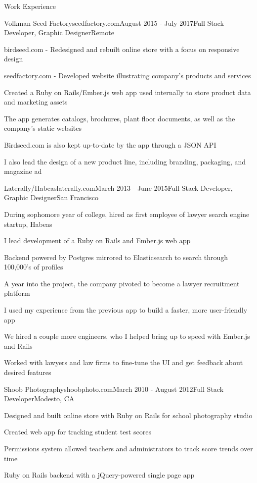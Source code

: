 \documentclass{resume} %
\begin{document}
\begin{rSection}{Work Experience}

\begin{rSubsection}{Volkman Seed Factory}{seedfactory.com}{August 2015 - July 2017}{Full Stack Developer, Graphic Designer}{Remote}
\item birdseed.com - Redesigned and rebuilt online store with a focus on responsive design
\item seedfactory.com - Developed website illustrating company's products and services
\item Created a Ruby on Rails/Ember.js web app used internally to store product data and marketing assets
\item The app generates catalogs, brochures, plant floor documents, as well as the company's static websites
\item Birdseed.com is also kept up-to-date by the app through a JSON API
\item I also lead the design of a new product line, including branding, packaging, and magazine ad
\end{rSubsection}

\begin{rSubsection}{Laterally/Habeas}{laterally.com}{March 2013 - June 2015}{Full Stack Developer, Graphic Designer}{San Francisco}
\item During sophomore year of college, hired as first employee of lawyer search engine startup, Habeas
\item I lead development of a Ruby on Rails and Ember.js web app
\item Backend powered by Postgres mirrored to Elasticsearch to search through 100,000's of profiles
\item A year into the project, the company pivoted to become a lawyer recruitment platform
\item I used my experience from the previous app to build a faster, more user-friendly app
\item We hired a couple more engineers, who I helped bring up to speed with Ember.js and Rails
\item Worked with lawyers and law firms to fine-tune the UI and get feedback about desired features
\end{rSubsection}

\begin{rSubsection}{Shoob Photography}{shoobphoto.com}{March 2010 - August 2012}{Full Stack Developer}{Modesto, CA}
\item Designed and built online store with Ruby on Rails for school photography studio
\item Created web app for tracking student test scores
\item Permissions system allowed teachers and administrators to track score trends over time
\item Ruby on Rails backend with a jQuery-powered single page app
\end{rSubsection}

\end{rSection}
\end{document}
